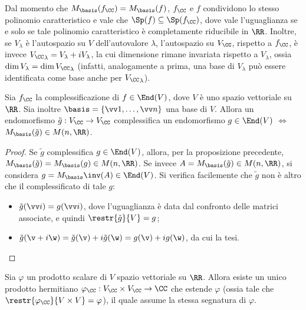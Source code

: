 \begin{remark}
	Dal momento che $M_\basis(f_\CC) = M_\basis(f)$, $f_\CC$ e $f$ condividono lo stesso polinomio caratteristico
	e vale che $\Sp(f) \subseteq \Sp(f_\CC)$, dove vale l'uguaglianza se e solo se tale polinomio caratteristico
	è completamente riducibile in $\RR$. Inoltre, se $V_\lambda$ è l'autospazio su $V$ dell'autovalore $\lambda$, l'autospazio
	su $V_\CC$, rispetto a $f_\CC$, è invece ${V_\CC}_\lambda = V_\lambda + i V_\lambda$, la cui
	dimensione rimane invariata rispetto a $V_\lambda$, ossia $\dim V_\lambda = \dim {V_\CC}_\lambda$
	(infatti, analogamente a prima, una base di $V_\lambda$ può essere identificata come base
	anche per ${V_\CC}_\lambda$).
\end{remark}

\begin{proposition}
	Sia $f_\CC$ la complessificazione di $f \in \End(V)$, dove $V$ è uno spazio vettoriale su $\RR$.
	Sia inoltre $\basis = \{ \vv 1, \ldots, \vv n \}$ una base di $V$. Allora un endomorfismo
	$\tilde g : V_\CC \to V_\CC$ complessifica un endomorfismo $g \in \End(V)$ $\iff$ $M_\basis(\tilde g) \in M(n, \RR)$.
\end{proposition}

\begin{proof}
	Se $\tilde g$ complessifica $g \in \End(V)$, allora, per la proposizione precedente,
	$M_\basis(\tilde g) = M_\basis(g) \in M(n, \RR)$. Se invece $A = M_\basis(\tilde g) \in M(n, \RR)$,
	si considera $g = M_\basis\inv(A) \in \End(V)$. Si verifica facilemente che $\tilde g$ non è altro che
	il complessificato di tale $g$:
	
	\begin{itemize}
		\item $\tilde g (\vv i) = g(\vv i)$, dove l'uguaglianza è data dal confronto delle matrici associate,
		e quindi $\restr{\tilde g}{V} = g$;
		\item $\tilde g(\v + i\w) = \tilde g(\v) + i \tilde g(\w) = g(\v) + i g(\w)$, da cui la tesi.
	\end{itemize}
\end{proof}

\begin{proposition}
	Sia $\varphi$ un prodotto scalare di $V$ spazio vettoriale su $\RR$. Allora esiste un
	unico prodotto hermitiano $\varphi_\CC : V_\CC \times V_\CC \to \CC$ che estende $\varphi$ (ossia tale che
	$\restr{\varphi_\CC}{V \times V} = \varphi$), il quale assume la stessa segnatura
	di $\varphi$.
\end{proposition}

